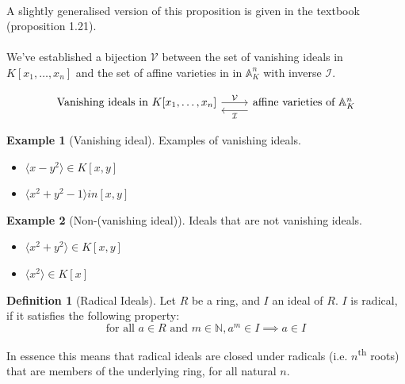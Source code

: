 \documentclass[12pt, a4paper]{article}
\theoremstyle{definition}
\newtheorem{definition}{Definition}
\newtheorem{example}{Example}
\begin{document}
\paragraph{} A slightly generalised version of this proposition is given in the textbook (proposition 1.21).
\paragraph{} We've established a bijection $\mathcal{V}$ between the set of vanishing ideals in $K[x_1, \dots, x_n]$ and the set of affine varieties in in $\mathbb{A}^n_K$ with inverse $\mathcal{I}$.

\[\begin{tikzcd}
	{\text{Vanishing ideals in } K[x_1,\ldots,x_n]} & {\text{affine varieties of } \mathbb{A}^n_K}
	\arrow["{\mathcal{V}}", from=1-1, to=1-2]
	\arrow["{\mathcal{I}}", shift left=3, from=1-2, to=1-1]
\end{tikzcd}\]

\begin{example}[Vanishing ideal]
  Examples of vanishing ideals.
  \begin{itemize}
  \item $\langle x-y^2 \rangle \in K[x,y]$
  \item $\langle x^2 + y^2 - 1 \rangle in [x,y]$
  \end{itemize}
\end{example}

\begin{example}[Non-(vanishing ideal)]
  Ideals that are not vanishing ideals.
  \begin{itemize}
  \item $\langle x^2 + y^2\rangle \in K[x,y]$
  \item $\langle x^2 \rangle \in K[x]$
  \end{itemize}
\end{example}


\begin{definition}[Radical Ideals]
	Let $R$ be a ring, and $I$ an ideal of $R$. $I$ is radical, if it satisfies the following property:
	$$
	\text{for all } a \in R \text{ and } m \in \mathbb{N}, a^m \in I \implies a \in I
	$$
\end{definition}
In essence this means that radical ideals are closed under radicals (i.e. $n$\textsuperscript{th} roots) that are members of the underlying ring, for all natural $n$.
\end{document}
